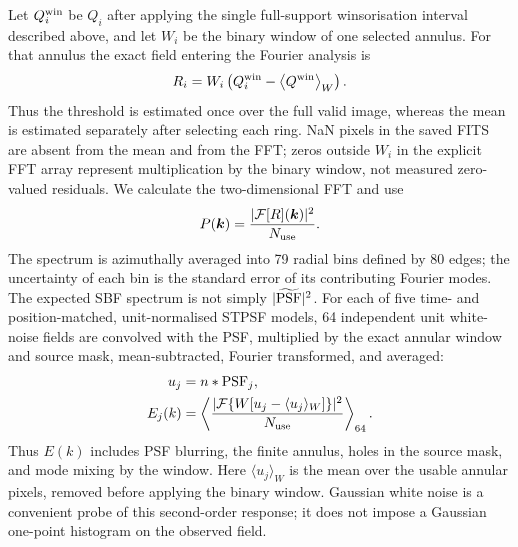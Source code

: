 \documentclass[nodoi,nocopyright]{pas}
\begin{document}
Let $Q_i^{\rm win}$ be $Q_i$ after applying the single full-support
winsorisation interval described above, and let $W_i$ be the binary window of
one selected annulus.  For that annulus the exact field entering the Fourier
analysis is
\begin{equation}
 R_i=W_i\left(Q_i^{\rm win}
 -\left\langle Q^{\rm win}\right\rangle_W\right).
 \label{eq:normalized-residual}
\end{equation}
Thus the threshold is estimated once over the full valid image, whereas the
mean is estimated separately after selecting each ring.  NaN pixels in the
saved FITS are absent from the mean and from the FFT; zeros outside $W_i$ in
the explicit FFT array represent multiplication by the binary window, not
measured zero-valued residuals.  We calculate the two-dimensional FFT and use
\begin{equation}
 P(\boldsymbol{k})=\frac{|\mathcal{F}[R](\boldsymbol{k})|^2}{N_{\rm use}}.
\end{equation}
The spectrum is azimuthally averaged into 79 radial bins defined by 80 edges; the uncertainty of
each bin is the standard error of its contributing Fourier modes. The expected
SBF spectrum is not simply $|\widetilde{\rm PSF}|^2$. For each of five
time- and position-matched, unit-normalised STPSF models, 64 independent unit
white-noise fields are convolved with the PSF, multiplied by the exact annular
window and source mask, mean-subtracted, Fourier transformed, and averaged:
\begin{equation}
 \begin{aligned}
 u_j&=n*{\rm PSF}_j,\\
 E_j(k)&=\left\langle
 \frac{|\mathcal{F}\{W[u_j-\langle u_j\rangle_W]\}|^2}{N_{\rm use}}
 \right\rangle_{64}.
 \end{aligned}
 \label{eq:expectation-spectrum}
\end{equation}
Thus $E(k)$ includes PSF blurring, the finite annulus, holes in the source mask,
and mode mixing by the window. Here $\langle u_j\rangle_W$ is the mean over
the usable annular pixels, removed before applying the binary window.
Gaussian white noise is a convenient probe of this second-order response;
it does not impose a Gaussian one-point histogram on the observed field.
\end{document}
